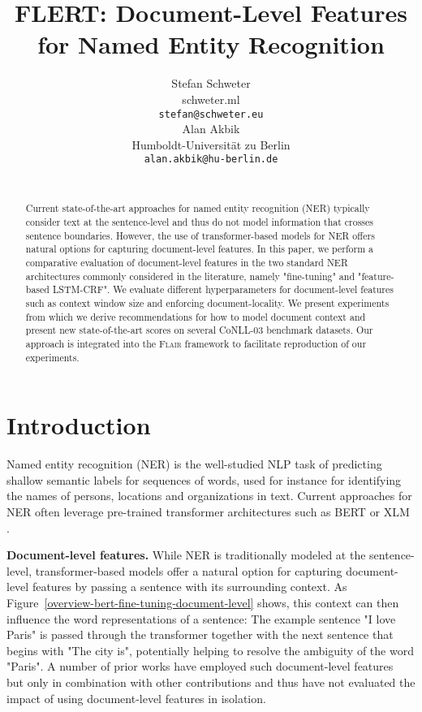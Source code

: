 \documentclass[11pt,a4paper]{article}
\title{FLERT: Document-Level Features for Named Entity Recognition}
\author{
Stefan Schweter \\
	schweter.ml\\
	{\tt stefan@schweter.eu}\\\And
Alan Akbik \\
	Humboldt-Universität zu Berlin\\
	{\tt alan.akbik@hu-berlin.de}\\
\\}
\date{}
\begin{document}
\maketitle
\begin{abstract}


Current state-of-the-art approaches for named entity recognition (NER) typically consider text at the sentence-level and thus do not model information that crosses sentence boundaries. However, the use of transformer-based models for NER offers natural options for capturing document-level features. In this paper, we perform a comparative evaluation of document-level features in the two standard NER architectures commonly considered in the literature, namely "fine-tuning" and "feature-based LSTM-CRF". We evaluate different hyperparameters for document-level features such as context window size and enforcing document-locality. We present experiments from which we derive recommendations for how to model document context and present new state-of-the-art scores on several CoNLL-03 benchmark datasets. Our approach is integrated into the \textsc{Flair} framework to facilitate reproduction of our experiments. 








\end{abstract}

\section{Introduction}
\vspace{-1mm}

Named entity recognition (NER) is the well-studied NLP task of predicting shallow semantic labels for sequences of words, used for instance for identifying the names of persons, locations and organizations in text. Current approaches for NER often leverage pre-trained transformer architectures such as BERT \citep{devlin-etal-2019-bert} or XLM \citep{lample2019cross}.

\noindent 
\textbf{Document-level features.} While NER is traditionally modeled at the sentence-level, transformer-based models offer a natural option for capturing document-level features by passing a sentence with its surrounding context. As Figure~\ref{overview-bert-fine-tuning-document-level} shows, this context can then influence the word representations of a sentence: The example sentence "I love Paris" is passed through the transformer together with the next sentence that begins with "The city is", potentially helping to resolve the ambiguity of the word "Paris".  
A number of prior works have employed such document-level features~\cite{devlin-etal-2019-bert, virtanen2019multilingual,yu-etal-2020-named} but only in combination with other contributions and thus have not evaluated the impact of using document-level features in isolation. 
\end{document}
